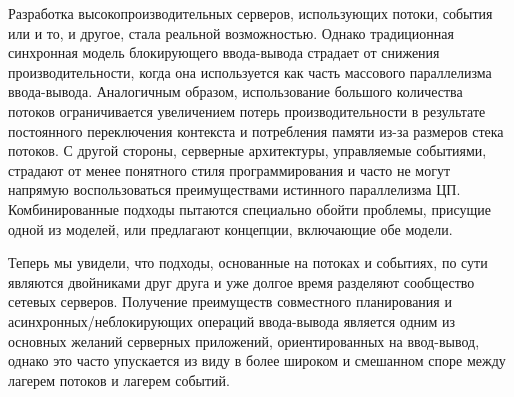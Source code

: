 Разработка высокопроизводительных серверов, использующих потоки, события или и то, и другое, стала реальной возможностью. Однако традиционная синхронная модель блокирующего ввода-вывода страдает от снижения производительности, когда она используется как часть массового параллелизма ввода-вывода. Аналогичным образом, использование большого количества потоков ограничивается увеличением потерь производительности в результате постоянного переключения контекста и потребления памяти из-за размеров стека потоков. С другой стороны, серверные архитектуры, управляемые событиями, страдают от менее понятного стиля программирования и часто не могут напрямую воспользоваться преимуществами истинного параллелизма ЦП. Комбинированные подходы пытаются специально обойти проблемы, присущие одной из моделей, или предлагают концепции, включающие обе модели.

Теперь мы увидели, что подходы, основанные на потоках и событиях, по сути являются двойниками друг друга и уже долгое время разделяют сообщество сетевых серверов. Получение преимуществ совместного планирования и асинхронных/неблокирующих операций ввода-вывода является одним из основных желаний серверных приложений, ориентированных на ввод-вывод, однако это часто упускается из виду в более широком и смешанном споре между лагерем потоков и лагерем событий.

\clearpage
